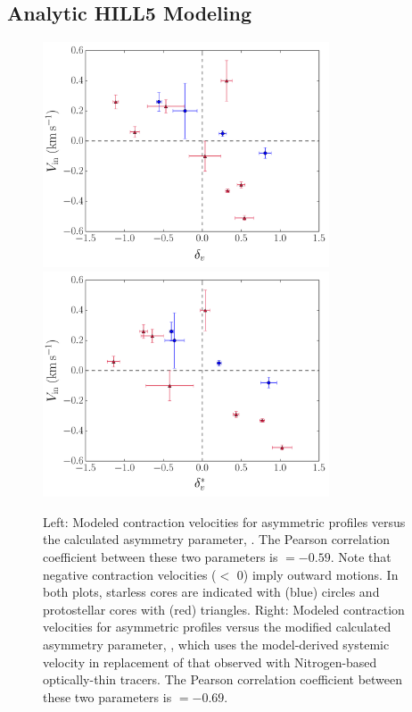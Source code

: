 \documentclass[iop,twocolappendix]{emulateapj}
\begin{document}
\subsection{Analytic HILL5 Modeling}
\label{subsec:Hill}

\begin{figure} 
\begin{center}
\includegraphics[width=8.5cm]{VelocityDifferenceInfallVelocity.pdf}
\hspace{0.5cm}
\includegraphics[width=8.5cm]{VelocityDifferenceInfallVelocity2.pdf}
\caption{Left: Modeled contraction velocities for asymmetric {\HCO} profiles versus the calculated asymmetry parameter, {\deltaV}. The Pearson correlation coefficient between these two parameters is {\rhoPCC}$=-0.59$. Note that negative contraction velocities ({\Vin}$ < $ 0) imply outward motions. In both plots, starless cores are indicated with (blue) circles and protostellar cores with (red) triangles.
%
Right: Modeled contraction velocities for asymmetric {\HCO} profiles versus the modified calculated asymmetry parameter, {\deltaVstar}, which uses the model-derived systemic velocity in replacement of that observed with Nitrogen-based optically-thin tracers. The Pearson correlation coefficient between these two parameters is {\rhoPCC}$=-0.69$. 
%
}
\label{fig:infallcomparison}
\end{center}
\end{figure}
\end{document}
